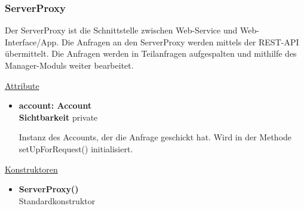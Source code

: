 \subsubsection{ServerProxy} \label{service:klasse:ServerProxy}
Der ServerProxy ist die Schnittstelle zwischen Web-Service und Web-Interface/App. Die Anfragen an den ServerProxy werden mittels der REST-API übermittelt. Die Anfragen werden in Teilanfragen aufgespalten und mithilfe des Manager-Moduls weiter bearbeitet. \newline

\underline{Attribute}
\begin{itemize}
\itemsep0pt
\item \textbf{account: Account} \hfill\\ 
\textbf{Sichtbarkeit} private

Instanz des Accounts, der die Anfrage geschickt hat. Wird in der Methode setUpForRequest() initialisiert.
\end{itemize}

\underline{Konstruktoren}
\begin{itemize}
\itemsep0pt
\item \textbf{ServerProxy()} \hfill\\
Standardkonstruktor
\end{itemize}

